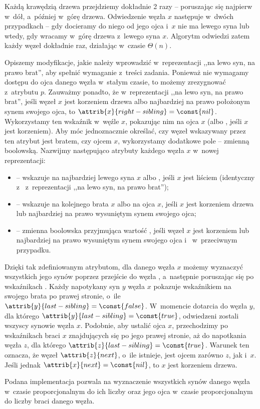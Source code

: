 Każdą krawędzią drzewa przejdziemy dokładnie 2 razy -- poruszając się najpierw w~dół, a~później w~górę drzewa.
Odwiedzenie węzła $x$ następuje w~dwóch przypadkach -- gdy docieramy do niego od jego ojca i~$x$ nie ma lewego syna lub wtedy, gdy wracamy w~górę drzewa z~lewego syna $x$.
Algorytm odwiedzi zatem każdy węzeł dokładnie raz, działając w~czasie $\Theta(n)$.

\exercise %

\noindent Opiszemy modyfikacje, jakie należy wprowadzić w~reprezentacji ,,na lewo syn, na prawo brat'', aby spełnić wymaganie z~treści zadania.
Ponieważ nie wymagamy dostępu do ojca danego węzła w~stałym czasie, to możemy zrezygnować z~atrybutu $p$.
Zauważmy ponadto, że w~reprezentacji ,,na lewo syn, na prawo brat'', jeśli węzeł $x$ jest korzeniem drzewa albo najbardziej na prawo położonym synem swojego ojca, to $\attrib{x}{right-sibling}=\const{nil}$.
Wykorzystamy ten wskaźnik w~węźle $x$, pokazując nim na ojca $x$ (albo , jeśli $x$ jest korzeniem).
Aby móc jednoznacznie określać, czy węzeł wskazywany przez ten atrybut jest bratem, czy ojcem $x$, wykorzystamy dodatkowe pole -- zmienną boolowską.
Nazwijmy następująco atrybuty każdego węzła $x$ w~nowej reprezentacji:
\begin{itemize}
	\item {} -- wskazuje na najbardziej lewego syna $x$ albo , jeśli $x$ jest liściem (identyczny z~ z~reprezentacji ,,na lewo syn, na prawo brat'');
	\item {} -- wskazuje na kolejnego brata $x$ albo na ojca $x$, jeśli $x$ jest korzeniem drzewa lub najbardziej na prawo wysuniętym synem swojego ojca;
	\item {} -- zmienna boolowska przyjmująca wartość , jeśli węzeł $x$ jest korzeniem lub najbardziej na prawo wysuniętym synem swojego ojca i~ w~przeciwnym przypadku.
\end{itemize}

Dzięki tak zdefiniowanym atrybutom, dla danego węzła $x$ możemy wyznaczyć wszystkich jego synów poprzez przejście do węzła , a~następnie poruszając się po wskaźnikach .
Każdy napotykany syn $y$ węzła $x$ pokazuje wskaźnikiem  na swojego brata po prawej stronie, o~ile $\attrib{y}{last-sibling}=\const{false}$.
W~momencie dotarcia do węzła $y$, dla którego $\attrib{y}{last-sibling}=\const{true}$, odwiedzeni zostali wszyscy synowie węzła $x$.
Podobnie, aby ustalić ojca $x$, przechodzimy po wskaźnikach  braci $x$ znajdujących się po jego prawej stronie, aż do napotkania węzła $z$, dla którego $\attrib{z}{last-sibling}=\const{true}$.
Warunek ten oznacza, że węzeł $\attrib{z}{next}$, o~ile istnieje, jest ojcem zarówno $z$, jak i~$x$.
Jeśli jednak $\attrib{x}{next}=\const{nil}$, to $x$ jest korzeniem drzewa.

Podana implementacja pozwala na wyznaczenie wszystkich synów danego węzła w~czasie proporcjonalnym do ich liczby oraz jego ojca w~czasie proporcjonalnym do liczby braci danego węzła.
